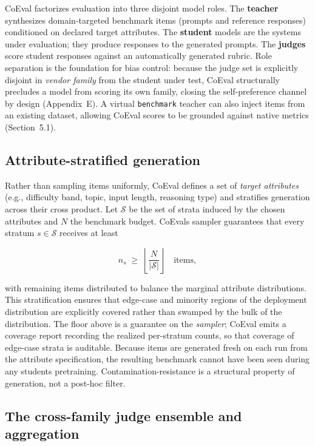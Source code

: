 \documentclass[11pt,a4paper]{article}
\begin{document}
CoEval factorizes evaluation into three disjoint model roles. The \textbf{teacher} synthesizes domain-targeted
benchmark items (prompts and reference responses) conditioned on declared target attributes. The \textbf{student}
models are the systems under evaluation; they produce responses to the generated prompts. The \textbf{judges}
score student responses against an automatically generated rubric. Role separation is the foundation for bias control:
because the judge set is explicitly disjoint in \emph{vendor family} from the student under test, CoEval structurally
precludes a model from scoring its own family, closing the self-preference channel by design (Appendix~E). A
virtual \texttt{benchmark} teacher can also
inject items from an existing dataset, allowing CoEval scores to be grounded against native metrics (Section~5.1).

\subsection{Attribute-stratified generation}\label{attribute-stratified-generation}

Rather than sampling items uniformly, CoEval defines a set of \emph{target attributes} (e.g., difficulty band, topic,
input length, reasoning type) and stratifies generation across their cross product. Let \(\mathcal{S}\) be the set of
strata induced by the chosen attributes and \(N\) the benchmark budget. CoEval\textquotesingle s sampler guarantees that every stratum
\(s \in \mathcal{S}\) receives at least

\[n_s \;\ge\; \left\lfloor \frac{N}{|\mathcal{S}|} \right\rfloor \quad \text{items},\]

with remaining items distributed to balance the marginal attribute distributions. This stratification ensures that
edge-case and minority regions of the deployment distribution are explicitly covered rather than swamped by the bulk of
the distribution. The floor above is a guarantee on the \emph{sampler}; CoEval emits a coverage report recording the realized per-stratum counts, so that coverage of edge-case strata is auditable. Because items are generated fresh on
each run from the attribute specification, the resulting benchmark cannot have been seen during any student\textquotesingle s
pretraining. Contamination-resistance is a structural property of generation, not a post-hoc filter.

\subsection{The cross-family judge ensemble and aggregation}\label{the-cross-family-judge-ensemble-and-aggregation}
\end{document}
